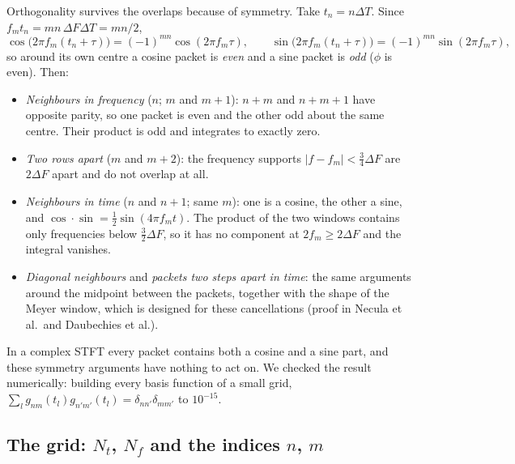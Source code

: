 \documentclass[11pt,a4paper]{article}
\begin{document}
Orthogonality survives the overlaps because of symmetry. Take $t_n=n\Delta T$. Since
$f_m t_n = mn\,\Delta F\Delta T = mn/2$,
\[
  \cos\big(2\pi f_m (t_n+\tau)\big) = (-1)^{mn}\cos(2\pi f_m\tau),\qquad
  \sin\big(2\pi f_m (t_n+\tau)\big) = (-1)^{mn}\sin(2\pi f_m\tau),
\]
so around its own centre a cosine packet is \emph{even} and a sine packet is
\emph{odd} ($\phi$ is even). Then:
\begin{itemize}
  \item \emph{Neighbours in frequency} ($n$; $m$ and $m+1$): $n+m$ and $n+m+1$ have
        opposite parity, so one packet is even and the other odd about the same
        centre. Their product is odd and integrates to exactly zero.
  \item \emph{Two rows apart} ($m$ and $m+2$): the frequency supports
        $|f-f_m|<\tfrac34\Delta F$ are $2\Delta F$ apart and do not overlap at all.
  \item \emph{Neighbours in time} ($n$ and $n+1$; same $m$): one is a cosine, the other
        a sine, and $\cos\cdot\sin=\tfrac12\sin(4\pi f_m t)$. The product of the two
        windows contains only frequencies below $\tfrac32\Delta F$, so it has no
        component at $2f_m\ge2\Delta F$ and the integral vanishes.
  \item \emph{Diagonal neighbours} and \emph{packets two steps apart in time}: the
        same arguments around the midpoint between the packets, together with the
        shape of the Meyer window, which is designed for these cancellations (proof
        in Necula et al.\ and Daubechies et al.).
\end{itemize}
In a complex STFT every packet contains both a cosine and a sine part, and these
symmetry arguments have nothing to act on. We checked the result numerically: building
every basis function of a small grid, $\sum_l g_{nm}(t_l)g_{n'm'}(t_l)=\delta_{nn'}
\delta_{mm'}$ to $10^{-15}$.

\subsection{The grid: $N_t$, $N_f$ and the indices $n$, $m$}
\end{document}
